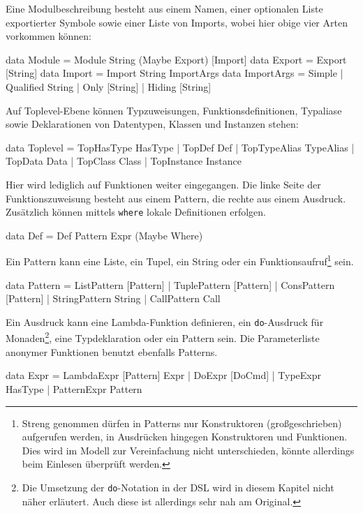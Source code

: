 \documentclass[12pt, a4paper, bibgerm]{scrbook}
\newenvironment{DIFnomarkup}{}{}
\newcommand\icode[1]{\lstinline?#1?}
\begin{document}
Eine Modulbeschreibung besteht aus einem Namen, einer optionalen Liste
exportierter Symbole sowie einer Liste von Imports, wobei hier obige
vier Arten vorkommen können:
\begin{DIFnomarkup}\begin{code}
data Module = Module String (Maybe Export) [Import]
data Export = Export [String]
data Import = Import String ImportArgs
data ImportArgs = Simple
                | Qualified String
                | Only [String]
                | Hiding [String]
\end{code}\end{DIFnomarkup}
Auf Toplevel-Ebene können Typzuweisungen, Funktionsdefinitionen,
Typaliase sowie Deklarationen von Datentypen, Klassen und Instanzen stehen:
\begin{DIFnomarkup}\begin{code}
data Toplevel = TopHasType HasType
              | TopDef Def
              | TopTypeAlias TypeAlias
              | TopData Data
              | TopClass Class
              | TopInstance Instance
\end{code}\end{DIFnomarkup}
Hier wird lediglich auf Funktionen weiter eingegangen. Die linke Seite der
Funktionszuweisung besteht aus einem Pattern, die rechte aus einem
Ausdruck. Zusätzlich können mittels \icode{where} lokale Definitionen
erfolgen.
\begin{DIFnomarkup}\begin{code}
data Def = Def Pattern Expr (Maybe Where)
\end{code}\end{DIFnomarkup}
Ein Pattern kann eine Liste, ein Tupel, ein String oder ein
Funktionsaufruf\footnote{Streng genommen dürfen in Patterns nur
  Konstruktoren (großgeschrieben) aufgerufen werden, in Ausdrücken
  hingegen Konstruktoren und Funktionen. Dies wird im Modell zur
  Vereinfachung nicht unterschieden, könnte allerdings beim Einlesen
  überprüft werden.} sein.
\begin{DIFnomarkup}\begin{code}
data Pattern = ListPattern [Pattern]
             | TuplePattern [Pattern]
             | ConsPattern [Pattern]
             | StringPattern String
             | CallPattern Call
\end{code}\end{DIFnomarkup}
Ein Ausdruck kann eine Lambda-Funktion definieren, ein
\icode{do}-Ausdruck für Monaden\footnote{Die Umsetzung der
  \icode{do}-Notation in der DSL wird in diesem Kapitel nicht
  näher erläutert. Auch diese ist allerdings sehr nah am
  Original.}, eine Typdeklaration oder ein Pattern sein. Die
Parameterliste anonymer Funktionen benutzt ebenfalls Patterns.
\begin{DIFnomarkup}\begin{code}
data Expr = LambdaExpr  [Pattern] Expr
          | DoExpr      [DoCmd]
          | TypeExpr    HasType
          | PatternExpr Pattern
\end{code}\end{DIFnomarkup}
\end{document}
